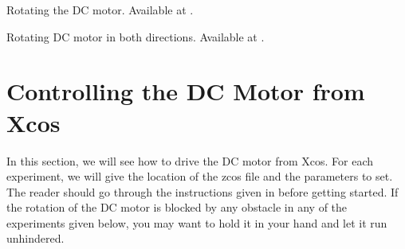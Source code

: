\begin{scicode}
{Rotating the DC motor.  Available at
  .}
\label{sci:dcmotor-clock}

\end{scicode}

\begin{scicode}
{Rotating DC motor in both directions.  Available at
  .}
\label{sci:dcmotor-both}

\end{scicode}

\begin{scicode}
\label{sci:dcmotor-loop}

\end{scicode}

\section{Controlling the DC Motor from Xcos}
In this section, we will see how to drive the DC motor from Xcos.  For
each experiment, we will give the location of the zcos file and the
parameters to set.  The reader should go through the instructions
given in  before getting started.  If the
rotation of the DC motor is blocked by any obstacle in any of the
experiments given below, you may want to hold it in your hand and let
it run unhindered.

